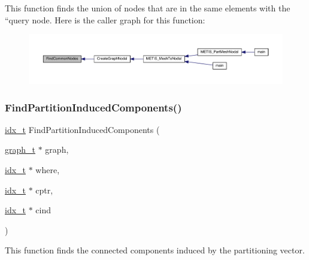 This function finds the union of nodes that are in the same elements with the ``query\textquotesingle{}\textquotesingle{} node. Here is the caller graph for this function\+:\nopagebreak
\begin{figure}[H]
\begin{center}
\leavevmode
\includegraphics[width=350pt]{a00945_aa3fb3adf98a0168ead1ff715114ebea1_icgraph}
\end{center}
\end{figure}
\mbox{\label{a00945_a9fe01ab71e17df2db81db0ce0376cc96}} 
\subsubsection{\texorpdfstring{Find\+Partition\+Induced\+Components()}{FindPartitionInducedComponents()}}
{\footnotesize\ttfamily \hyperlink{a00876_aaa5262be3e700770163401acb0150f52}{idx\+\_\+t} Find\+Partition\+Induced\+Components (\begin{DoxyParamCaption}\item[{\hyperlink{a00734}{graph\+\_\+t} $\ast$}]{graph,  }\item[{\hyperlink{a00876_aaa5262be3e700770163401acb0150f52}{idx\+\_\+t} $\ast$}]{where,  }\item[{\hyperlink{a00876_aaa5262be3e700770163401acb0150f52}{idx\+\_\+t} $\ast$}]{cptr,  }\item[{\hyperlink{a00876_aaa5262be3e700770163401acb0150f52}{idx\+\_\+t} $\ast$}]{cind }\end{DoxyParamCaption})}

This function finds the connected components induced by the partitioning vector.


